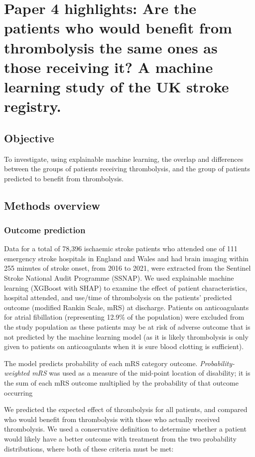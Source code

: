 \section{Paper 4 highlights: Are the patients who would benefit from thrombolysis the same ones as those receiving it? A machine learning study of the UK stroke registry.\cite{pearn_are_2024}}\label{sec:paper_4}

\subsection{Objective}

To investigate, using explainable machine learning, the overlap and differences between the groups of patients receiving thrombolysis, and the group of patients predicted to benefit from thrombolysis.

\subsection{Methods overview}

\subsubsection{Outcome prediction}

Data for a total of 78,396 ischaemic stroke patients who attended one of 111 emergency stroke hospitals in England and Wales and had brain imaging within 255 minutes of stroke onset, from 2016 to 2021, were extracted from the Sentinel Stroke National Audit Programme (SSNAP). We used explainable machine learning (XGBoost\cite{chen_xgboost_2016} with SHAP\cite{lundberg_unified_2017}) to examine the effect of patient characteristics, hospital attended, and use/time of thrombolysis on the patients’ predicted outcome (modified Rankin Scale, mRS) at discharge. Patients on anticoagulants for atrial fibillation (representing 12.9\% of the population) were excluded from the study population as these patients may be at risk of adverse outcome that is not predicted by the machine learning model (as it is likely thrombolysis is only given to patients on anticoagulants when it is sure blood clotting is sufficient).

The model predicts probability of each mRS category outcome.  \textit{Probability-weighted mRS} was used as a measure of the mid-point location of disability; it is the sum of each mRS outcome multiplied by the probability of that outcome occurring

We predicted the expected effect of thrombolysis for all patients, and compared who would benefit from thrombolysis with those who actually received thrombolysis. We used a conservative definition to determine whether a patient would likely have a better outcome with treatment from the two probability distributions, where both of these criteria must be met: 

